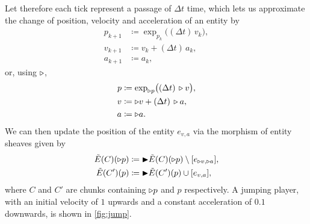 {Let therefore each tick represent a passage of $\Delta t$ time, which lets us
approximate the change of position, velocity and acceleration of an entity by
\begin{align*}
	p_{k+1} & \coloneqq \exp_{p_k}\bigl((\Delta t)\, v_k\bigr), \\
	v_{k+1} & \coloneqq v_k + (\Delta t)\, a_k, \\
	a_{k+1} & \coloneqq a_k,
\end{align*}
or, using $\triangleright$,
\begin{align*}
	p & \coloneqq \exp_{\triangleright p}\bigl((\Delta t)\, \triangleright v\bigr), \\
	v & \coloneqq \triangleright v + (\Delta t)\, \triangleright a, \\
	a & \coloneqq \triangleright a.
\end{align*}
We can then update the position of the entity $e_{v,a}$ via the morphism of
entity sheaves given by
\begin{align*}
	\tilde{E}(C)(\triangleright p) & \coloneqq
	\mathord{\blacktriangleright} \tilde{E}(C)(\triangleright p) \setminus [e_{\triangleright v, \triangleright a}], \\
	\tilde{E}(C')(p)            & \coloneqq
	\mathord{\blacktriangleright} \tilde{E}(C')(p) \cup [e_{v,a}],
\end{align*}
where $C$ and $C'$ are chunks containing $\triangleright p$ and $p$ respectively.
A jumping player, with an initial velocity of $1$ upwards and a constant
acceleration of $0.1$ downwards, is shown in \cref{fig:jump}.

}
